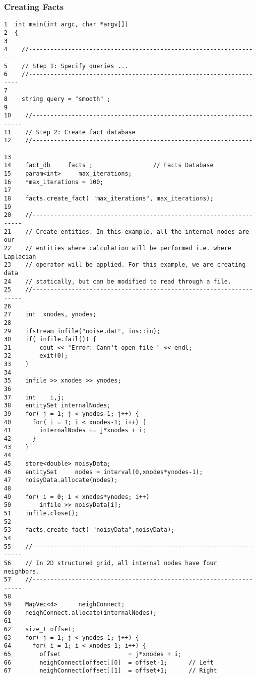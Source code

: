 \subsubsection { Creating Facts }
\begin{verbatim}
1  int main(int argc, char *argv[])
2  {
3
4    //-------------------------------------------------------------------
5    // Step 1: Specify queries ...
6    //-------------------------------------------------------------------
7
8    string query = "smooth" ;
9
10    //-------------------------------------------------------------------
11    // Step 2: Create fact database
12    //-------------------------------------------------------------------
13
14    fact_db     facts ;                 // Facts Database
15    param<int>     max_iterations;
16    *max_iterations = 100;
17
18    facts.create_fact( "max_iterations", max_iterations);
19
20    //-------------------------------------------------------------------
21    // Create entities. In this example, all the internal nodes are our
22    // entities where calculation will be performed i.e. where Laplacian
23    // operator will be applied. For this example, we are creating data
24    // statically, but can be modified to read through a file.
25    //-------------------------------------------------------------------
26
27    int  xnodes, ynodes;
28
29    ifstream infile("noise.dat", ios::in);
30    if( infile.fail()) {
31        cout << "Error: Cann't open file " << endl;
32        exit(0);
33    }
34
35    infile >> xnodes >> ynodes;
36
37    int    i,j;
38    entitySet internalNodes;
39    for( j = 1; j < ynodes-1; j++) {
40      for( i = 1; i < xnodes-1; i++) {
41        internalNodes += j*xnodes + i;
42      }
43    }
44
45    store<double> noisyData;
46    entitySet     nodes = interval(0,xnodes*ynodes-1);
47    noisyData.allocate(nodes);
48
49    for( i = 0; i < xnodes*ynodes; i++)
50        infile >> noisyData[i];
51    infile.close();
52
53    facts.create_fact( "noisyData",noisyData);
54
55    //-------------------------------------------------------------------
56    // In 2D structured grid, all internal nodes have four neighbors.
57    //-------------------------------------------------------------------
58
59    MapVec<4>      neighConnect;
60    neighConnect.allocate(internalNodes);
61
62    size_t offset;
63    for( j = 1; j < ynodes-1; j++) {
64      for( i = 1; i < xnodes-1; i++) {
65        offset                   = j*xnodes + i;
66        neighConnect[offset][0]  = offset-1;      // Left
67        neighConnect[offset][1]  = offset+1;      // Right

\end{verbatim}
